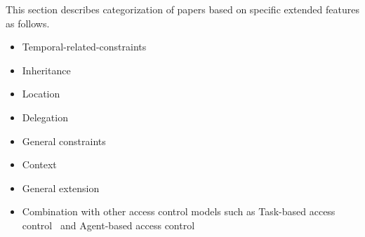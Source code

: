 This section describes categorization of papers based on specific extended features as follows. 
\begin{itemize}
	\item Temporal-related-constraints~\cite{mossakowski03:temporal,aich07:STARBAC,kumar06:strbac,samuel07:spatio-temporal,ray07:spatio,chandran05:llt,aich09:role,bertino01:trbac, li08:fine, joshi05:generalized, chen08:spatio-temporal}
	\item Inheritance~\cite{ren10:machine}
	\item Location~\cite{chandran05:llt}
	\item Delegation~\cite{hasebe10:capability}
	\item General constraints~\cite{alam06:constraint,yao08:task}
	\item Context~\cite{tzelepi01:flexible,haibo05:context,cholewka00:acontext-sensitive,huang06:pervasive,motta03:contextual,bao08:role}						
	\item General extension~\cite{han08:extended,zhang06:collaborative}
	\item Combination with other access control models such as Task-based access control~\cite{yao08:task,oh03:task,zhou07:network, oh00:task} and Agent-based access control~\cite{yamazaki04:designing}
\end{itemize}

